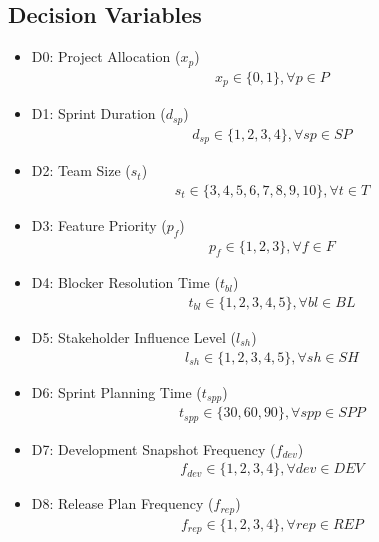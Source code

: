 \documentclass{article}
\begin{document}
\begin{itemize}
\begin{itemize}
\section{Decision Variables}
\begin{itemize}
    \item D0: Project Allocation ($x_p$)
        \begin{align*}
            x_p \in \{0,1\}, \forall p \in P
        \end{align*}
    \item D1: Sprint Duration ($d_{sp}$)
        \begin{align*}
            d_{sp} \in \{1,2,3,4\}, \forall sp \in SP
        \end{align*}
    \item D2: Team Size ($s_t$)
        \begin{align*}
            s_t \in \{3,4,5,6,7,8,9,10\}, \forall t \in T
        \end{align*}
    \item D3: Feature Priority ($p_f$)
        \begin{align*}
            p_f \in \{1,2,3\}, \forall f \in F
        \end{align*}
    \item D4: Blocker Resolution Time ($t_{bl}$)
        \begin{align*}
            t_{bl} \in \{1,2,3,4,5\}, \forall bl \in BL
        \end{align*}
    \item D5: Stakeholder Influence Level ($l_{sh}$)
        \begin{align*}
            l_{sh} \in \{1,2,3,4,5\}, \forall sh \in SH
        \end{align*}
    \item D6: Sprint Planning Time ($t_{spp}$)
        \begin{align*}
            t_{spp} \in \{30,60,90\}, \forall spp \in SPP
        \end{align*}
    \item D7: Development Snapshot Frequency ($f_{dev}$)
        \begin{align*}
            f_{dev} \in \{1,2,3,4\}, \forall dev \in DEV
        \end{align*}
    \item D8: Release Plan Frequency ($f_{rep}$)
        \begin{align*}
            f_{rep} \in \{1,2,3,4\}, \forall rep \in REP
        \end{align*}

\end{itemize}
\end{itemize}
\end{itemize}
\end{document}
